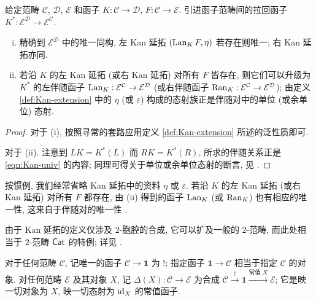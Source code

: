 \begin{proposition}\label{prop:Kan-uniqueness}
	给定范畴 $\mathcal{C}$, $\mathcal{D}$, $\mathcal{E}$ 和函子 $K: \mathcal{C} \to \mathcal{D}$, $F: \mathcal{C} \to \mathcal{E}$. 引进函子范畴间的拉回函子 $K^*: \mathcal{E}^{\mathcal{D}} \to \mathcal{E}^{\mathcal{C}}$.
	\begin{enumerate}[(i)]
		\item 精确到 $\mathcal{E}^{\mathcal{D}}$ 中的唯一同构, 左 Kan 延拓 $(\operatorname{Lan}_K F, \eta)$ 若存在则唯一; 右 Kan 延拓亦同.
		\item 若沿 $K$ 的左 Kan 延拓 (或右 Kan 延拓) 对所有 $F$ 皆存在, 则它们可以升级为 $K^*$ 的左伴随函子 $\operatorname{Lan}_K: \mathcal{E}^{\mathcal{C}} \to \mathcal{E}^{\mathcal{D}}$ (或右伴随函子 $\operatorname{Ran}_K: \mathcal{E}^{\mathcal{C}} \to \mathcal{E}^{\mathcal{D}}$); 由定义 \ref{def:Kan-extension} 中的 $\eta$ (或 $\varepsilon$) 构成的态射族正是伴随对中的单位 (或余单位) 态射.
	\end{enumerate}
\end{proposition}
\begin{proof}
	对于 (i), 按照寻常的套路应用定义 \ref{def:Kan-extension} 所述的泛性质即可.

	对于 (ii). 注意到 $LK = K^*(L)$ 而 $RK = K^*(R)$, 所求的伴随关系正是 \eqref{eqn:Kan-univ} 的内容; 同理可得关于单位或余单位态射的断言, 见 \cite[命题 2.6.5]{Li1}.
\end{proof}

按惯例, 我们经常省略 Kan 延拓中的资料 $\eta$ 或 $\varepsilon$. 若沿 $K$ 的左 Kan 延拓 (或右 Kan 延拓) 对所有 $F$ 都存在, 由 (ii) 得到的函子 $\operatorname{Lan}_K$ (或 $\operatorname{Ran}_K$) 也有相应的唯一性, 这来自于伴随对的唯一性 \cite[命题 2.6.10]{Li1}.

\begin{remark}
	由于 Kan 延拓的定义仅涉及 $2$-胞腔的合成, 它可以扩及一般的 $2$-范畴, 而此处相当于 $2$-范畴 $\mathsf{Cat}$ 的特例; 详见 \cite[\S 3.5]{Li1}.
\end{remark}

对于任何范畴 $\mathcal{C}$, 记唯一的函子 $\mathcal{C} \to \mathbf{1}$ 为 $!$; 指定函子 $\mathbf{1} \to \mathcal{C}$ 相当于指定 $\mathcal{C}$ 的对象. 对任何范畴 $\mathcal{E}$ 及其对象 $X$, 记 $\Delta(X): \mathcal{C} \to \mathcal{E}$ 为合成 $\mathcal{C} \xrightarrow{!} \mathbf{1} \xrightarrow{\text{常值}\; X} \mathcal{E}$; 它是映一切对象为 $X$, 映一切态射为 $\mathrm{id}_X$ 的常值函子.

